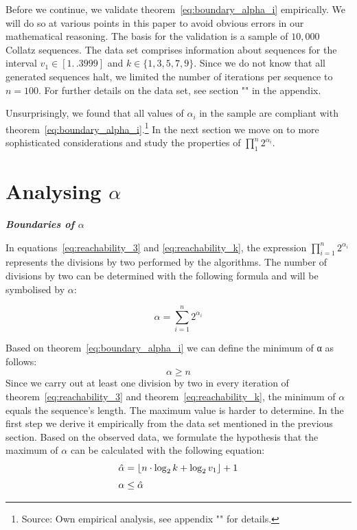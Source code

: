\documentclass{SciPress_2015}
\renewcommand{\subsection}[1]{\textit{\textbf{#1}}}
\begin{document}
Before we continue, we validate theorem~\ref{eq:boundary_alpha_i} empirically. We will do so at various points in this paper to avoid obvious errors in our mathematical reasoning. The basis for the validation is a sample of $10,000$ Collatz sequences. The data set comprises information about sequences for the interval $v_1\in[1\mathrel{{.}\,{.}}3999]$ and $k\in\{1,3,5,7,9\}$. Since we do not know that all generated sequences halt, we limited the number of iterations per sequence to $n=100$. For further details on the data set, see section "" in the appendix.

Unsurprisingly, we found that all values of $\alpha_i$ in the sample are compliant with theorem~\ref{eq:boundary_alpha_i}.\footnote{Source: Own empirical analysis, see appendix "" for details.} In the next section we move on to more sophisticated considerations and study the properties of $\prod_{1}^{n}2^{\alpha_i}$.

\section{Analysing \boldmath$\alpha$}
\label{sec:analysing_alpha}
\subsection{Boundaries of \boldmath$\alpha$}
\par\noindent
In equations~\ref{eq:reachability_3} and \ref{eq:reachability_k}, the expression $\prod_{i=1}^{n}2^{\alpha_i}$  represents the divisions by two performed by the algorithms. The number of divisions by two can be determined with the following formula and will be symbolised by $\alpha$:

\[
\alpha=\sum_{i=1}^{n}2^{\alpha_i}
\]

\newpage
\par\noindent
Based on theorem~\ref{eq:boundary_alpha_i} we can define the minimum of α as follows:
\[
\alpha\ge n
\]
Since we carry out at least one division by two in every iteration of theorem~\ref{eq:reachability_3} and theorem~\ref{eq:reachability_k}, the minimum of $\alpha$ equals the sequence's length. The maximum value is harder to determine. In the first step we derive it empirically from the data set mentioned in the previous section. Based on the observed data, we formulate the hypothesis that the maximum of $\alpha$ can be calculated with the following equation:
\begin{equation}
\label{eq:max_alpha}
\begin{array}{l}
\hat\alpha=\lfloor n\cdot\log_2k+\log_2v_1\rfloor+1\\[\medskipamount]
\alpha\le\hat\alpha
\end{array}	
\end{equation}
\end{document}
